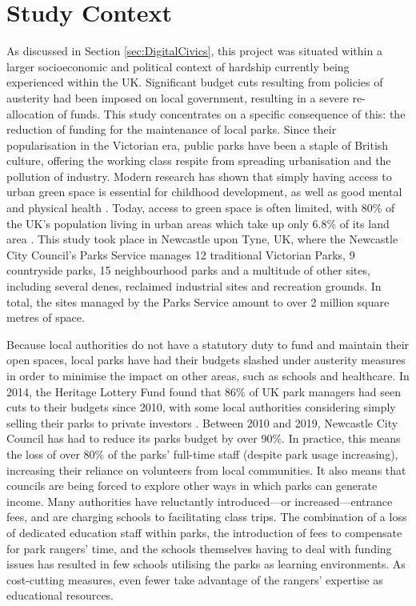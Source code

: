 \section{Study Context}
\label{sec:ParkContext}
As discussed in Section \ref{sec:DigitalCivics}, this project was situated within a larger socioeconomic and political context of hardship currently being experienced within the UK. Significant budget cuts resulting from policies of austerity had been imposed on local government, resulting in a severe re-allocation of funds. This study concentrates on a specific consequence of this: the reduction of funding for the maintenance of local parks. Since their popularisation in the Victorian era, public parks have been a staple of British culture, offering the working class respite from spreading urbanisation and the pollution of industry. Modern research has shown that simply having access to urban green space is essential for childhood development, as well as good mental and physical health \citep{Fiennes2015}. Today, access to green space is often limited, with 80\% of the UK’s population living in urban areas which take up only 6.8\% of its land area \citep{UKNationalEcosystemAssesment2011}. This study took place in Newcastle upon Tyne, UK, where the Newcastle City Council's Parks Service manages 12 traditional Victorian Parks, 9 countryside parks, 15 neighbourhood parks and a multitude of other sites, including several denes, reclaimed industrial sites and recreation grounds. In total, the sites managed by the Parks Service amount to over 2 million square metres of space.

Because local authorities do not have a statutory duty to fund and maintain their open spaces, local parks have had their budgets slashed under austerity measures in order to minimise the impact on other areas, such as schools and healthcare. In 2014, the Heritage Lottery Fund found that 86\% of UK park managers had seen cuts to their budgets since 2010, with some local authorities considering simply selling their parks to private investors \citep{HeritageLotteryFund2014}. Between 2010 and 2019, Newcastle City Council has had to reduce its parks budget by over 90\%. In practice, this means the loss of over 80\% of the parks' full-time staff (despite park usage increasing), increasing their reliance on volunteers from local communities.  It also means that councils are being forced to explore other ways in which parks can generate income. Many authorities have reluctantly introduced---or increased---entrance fees, and are charging schools to facilitating class trips. The combination of a loss of dedicated education staff within parks, the introduction of fees to compensate for park rangers’ time, and the schools themselves having to deal with funding issues has resulted in few schools utilising the parks as learning environments. As cost-cutting measures, even fewer take advantage of the rangers’ expertise as educational resources.


